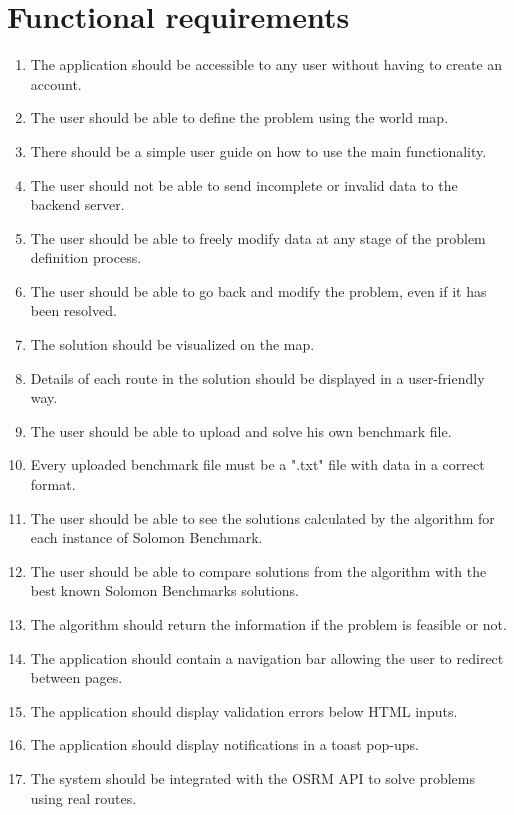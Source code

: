 \documentclass[a4paper,twoside,12pt]{book}
\begin{document}
\section{Functional requirements}
\begin{enumerate}
    \item The application should be accessible to any user without having to create an account.
    \item The user should be able to define the problem using the world map.
    \item There should be a simple user guide on how to use the main functionality.
    \item The user should not be able to send incomplete or invalid data to the backend server.
    \item The user should be able to freely modify data at any stage of the problem definition process.
    \item The user should be able to go back and modify the problem, even if it has been resolved.
    \item The solution should be visualized on the map.
    \item Details of each route in the solution should be displayed in a user-friendly way.
    \item The user should be able to upload and solve his own benchmark file.
    \item Every uploaded benchmark file must be a ".txt" file with data in a correct format.
    \item The user should be able to see the solutions calculated by the algorithm for each instance of Solomon Benchmark.
    \item The user should be able to compare solutions from the algorithm with the best known Solomon Benchmarks solutions.
    \item The algorithm should return the information if the problem is feasible or not.
    \item The application should contain a navigation bar allowing the user to redirect between pages.
    \item The application should display validation errors below HTML inputs.  
    \item The application should display notifications in a toast pop-ups.
    \item The system should be integrated with the OSRM API to solve problems using real routes.
\end{enumerate}
\end{document}
